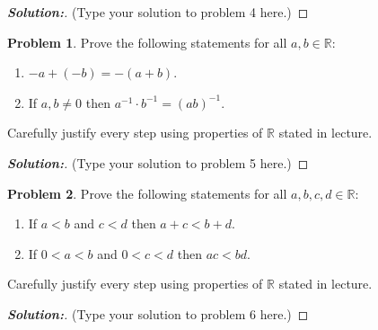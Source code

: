 \documentclass[12pt]{article}
\theoremstyle{definition}\newtheorem{problem}{Problem}
\newenvironment{solution}{\begin{proof}[\bfseries\textup{Solution:}]}{\end{proof}}
\begin{document}
\begin{solution}
(Type your solution to problem 4 here.)
\end{solution}

\newpage
\begin{problem}
Prove the following statements for all $a,b\in\mathbb{R}$:
\begin{enumerate}
\item $-a + (-b) = -(a+b)$.
\item If $a,b\neq 0$ then $a^{-1}\cdot b^{-1} = (ab)^{-1}$.
\end{enumerate}
Carefully justify every step using properties of $\mathbb{R}$ stated in lecture.
\end{problem}


\begin{solution}
(Type your solution to problem 5 here.)
\end{solution}

\newpage
\begin{problem}
Prove the following statements for all $a,b,c,d\in\mathbb{R}$:
\begin{enumerate}
\item If $a<b$ and $c<d$ then $a+c < b+d$.
\item If $0<a<b$ and $0<c<d$ then $ac<bd$.
\end{enumerate}
Carefully justify every step using properties of $\mathbb{R}$ stated in lecture.
\end{problem}
\begin{solution}

    
(Type your solution to problem 6 here.)
\end{solution}
\end{document}
